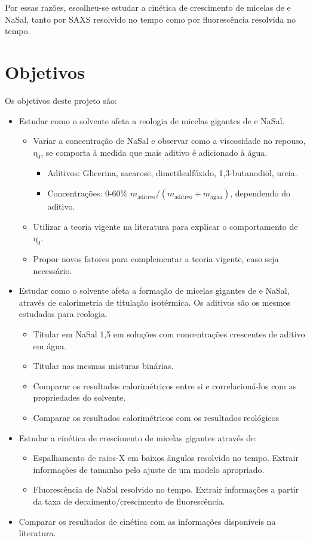 		Por essas razões, escolheu-se estudar a cinética de crescimento de micelas de \TTAB{} e NaSal, tanto por SAXS resolvido no tempo como por fluorescência resolvida no tempo.
		
	\chapter{Objetivos}
		Os objetivos deste projeto são:
		
		\begin{itemize}[noitemsep]
			\item Estudar como o solvente afeta a reologia de micelas gigantes de \CTAB{} e NaSal.
				\begin{itemize}[noitemsep]
					\item Variar a concentração de NaSal e observar como a viscosidade no repouso, \(\eta_0\), se comporta à medida que mais aditivo é adicionado à água.
						\begin{itemize}[noitemsep]
							\item Aditivos: Glicerina, sacarose, dimetilsulfóxido, 1,3-butanodiol, ureia.
							\item Concentrações: 0-60\% \(m_{\textrm{aditivo}}/\left(m_{\textrm{aditivo}}+m_{\textrm{água}}\right)\), dependendo do aditivo.
						\end{itemize}
					\item Utilizar a teoria vigente na literatura para explicar o comportamento de \(\eta_0\).
					\item Propor novos fatores para complementar a teoria vigente, caso seja necessário.
				\end{itemize}
			\item Estudar como o solvente afeta a formação de micelas gigantes de \TTAB{} e NaSal, através de calorimetria de titulação isotérmica. Os aditivos são os mesmos estudados para reologia.
				\begin{itemize}[noitemsep]
					\item Titular \TTAB{} em NaSal 1,5\mM{} em soluções com concentrações crescentes de aditivo em água.
					\item Titular \TTAB{} nas mesmas misturas binárias.
					\item Comparar os resultados calorimétricos entre si e correlacioná-los com as propriedades do solvente.
					\item Comparar os resultados calorimétricos com os resultados reológicos
				\end{itemize}
			\item Estudar a cinética de crescimento de micelas gigantes através de:
				\begin{itemize}[noitemsep]
					\item Espalhamento de raios-X em baixos ângulos resolvido no tempo. Extrair informações de tamanho pelo ajuste de um modelo apropriado.
					\item Fluorescência de NaSal resolvido no tempo. Extrair informações a partir da taxa de decaimento/crescimento de fluorescência.
				\end{itemize}
			\item Comparar os resultados de cinética com as informações disponíveis na literatura.
		\end{itemize}
	